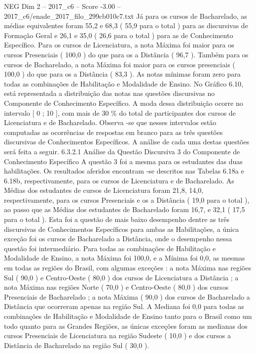 \begin{textsample}{NEG Dim 2 – 2017\_c6 – Score -3.00 – 2017\_c6/enade\_2017\_filo\_299cb010c7.txt}
Já para os cursos de Bacharelado, as médias equivalentes foram 55,2 e 68,3 ( 55,9 para o total ) para as discursivas de Formação Geral e 26,1 e 35,0 ( 26,6 para o total ) para as de Conhecimento Específico.
Para os cursos de Licenciatura, a nota Máxima foi maior para os cursos Presenciais ( 100,0 ) do que para os a Distância ( 96,7 ).
Também para os cursos de Bacharelado, a nota Máxima foi maior para os cursos presenciais ( 100,0 ) do que para os a Distância ( 83,3 ).
As notas mínimas foram zero para todas as combinações de Habilitação e Modalidade de Ensino.
No Gráfico 6.10, está representada a distribuição das notas nas questões discursivas no Componente de Conhecimento Específico.
A moda dessa distribuição ocorre no intervalo [ 0 ; 10 ], com mais de 30 \% do total de participantes dos cursos de Licenciatura e de Bacharelado.
Observa -se que nesses intervalos estão computadas as ocorrências de respostas em branco para as três questões discursivas de Conhecimentos Específicos.
A análise de cada uma destas questões será feita a seguir. 6.3.2.1 Análise da Questão Discursiva 3 do Componente de Conhecimento Específico A questão 3 foi a mesma para os estudantes das duas habilitações.
Os resultados aferidos encontram -se descritos nas Tabelas 6.18a e 6.18b, respectivamente, para os cursos de Licenciatura e de Bacharelado.
As Médias dos estudantes de cursos de Licenciatura foram 21,8, 14,0, respectivamente, para os cursos Presenciais e os a Distância ( 19,0 para o total ), ao passo que as Médias dos estudantes de Bacharelado foram 16,7, e 32,1 ( 17,5 para o total ).
Esta foi a questão de mais baixo desempenho dentre as três discursivas de Conhecimentos Específicos para ambas as Habilitações, a única exceção foi os cursos de Bacharelado a Distância, onde o desempenho nessa questão foi intermediário.
Para todas as combinações de Habilitação e Modalidade de Ensino, a nota Máxima foi 100,0, e a Mínima foi 0,0, as mesmas em todas as regiões do Brasil, com algumas exceções : a nota Máxima nas regiões Sul ( 90,0 ) e Centro-Oeste ( 80,0 ) dos cursos de Licenciatura a Distância ; a nota Máxima nas regiões Norte ( 70,0 ) e Centro-Oeste ( 80,0 ) dos cursos Presenciais de Bacharelado ; a nota Máxima ( 90,0 ) dos cursos de Bacharelado a Distância que ocorreram apenas na região Sul.
A Mediana foi 0,0 para todas as combinações de Habilitação e Modalidade de Ensino tanto para o Brasil como um todo quanto para as Grandes Regiões, as únicas exceções foram as medianas dos cursos Presenciais de Licenciatura na região Sudeste ( 10,0 ) e dos cursos a Distância de Bacharelado na região Sul ( 30,0 ).

\end{textsample}
